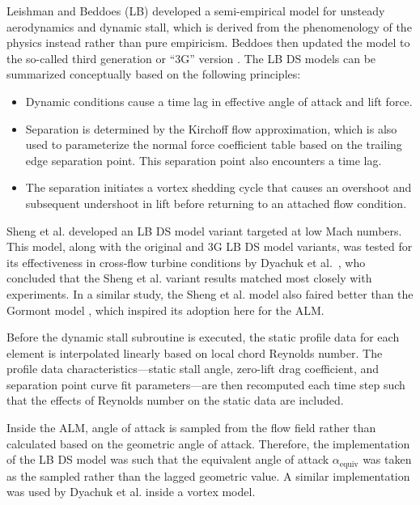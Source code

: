 Leishman and Beddoes (LB) \cite{Leishman1989} developed a semi-empirical model
for unsteady aerodynamics and dynamic stall, which is derived from the
phenomenology of the physics instead rather than pure empiricism. Beddoes then
updated the model to the so-called third generation or ``3G'' version
\cite{Beddoes1993}. The LB DS models can be summarized conceptually based on the
following principles:
\begin{itemize}
    \item Dynamic conditions cause a time lag in effective angle of attack and
    lift force.
    
    \item Separation is determined by the Kirchoff flow approximation, which is
    also used to parameterize the normal force coefficient table based on the
    trailing edge separation point. This separation point also encounters a time
    lag.
    
    \item The separation initiates a vortex shedding cycle that causes an
    overshoot and subsequent undershoot in lift before returning to an attached
    flow condition.
\end{itemize}

Sheng et al. \cite{Sheng2008} developed an LB DS model variant targeted at low
Mach numbers. This model, along with the original and 3G LB DS model variants,
was tested for its effectiveness in cross-flow turbine conditions by Dyachuk et
al.~\cite{Dyachuk2014}, who concluded that the Sheng et al. variant results
matched most closely with experiments. In a similar study, the Sheng et al.
model also faired better than the Gormont model \cite{Dyachuk2015}, which
inspired its adoption here for the ALM.

Before the dynamic stall subroutine is executed, the static profile data for
each element is interpolated linearly based on local chord Reynolds number. The
profile data characteristics---static stall angle, zero-lift drag coefficient,
and separation point curve fit parameters---are then recomputed each time step
such that the effects of Reynolds number on the static data are included.

Inside the ALM, angle of attack is sampled from the flow field rather than
calculated based on the geometric angle of attack. Therefore, the implementation
of the LB DS model was such that the equivalent angle of attack
$\alpha_\mathrm{equiv}$ was taken as the sampled rather than the lagged
geometric value. A similar implementation was used by Dyachuk et al.
\cite{Dyachuk2015a} inside a vortex model.



